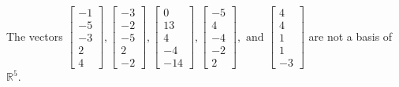 \begin{exercise}
\begin{exerciseStatement}
  \end{exerciseStatement}
  \begin{exerciseAnswer}
   The vectors \(\left[\begin{array}{r}
-1 \\
-5 \\
-3 \\
2 \\
4
\end{array}\right] , \left[\begin{array}{r}
-3 \\
-2 \\
-5 \\
2 \\
-2
\end{array}\right] , \left[\begin{array}{r}
0 \\
13 \\
4 \\
-4 \\
-14
\end{array}\right] , \left[\begin{array}{r}
-5 \\
4 \\
-4 \\
-2 \\
2
\end{array}\right] , \text{ and } \left[\begin{array}{r}
4 \\
4 \\
1 \\
1 \\
-3
\end{array}\right]\) 
  	 are not  a basis of \(\mathbb{R}^5\).
  


  \end{exerciseAnswer}
\end{exercise}